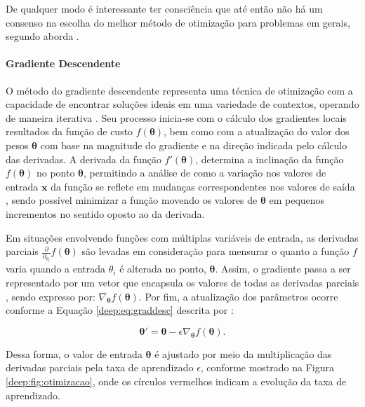 De qualquer modo é interessante ter consciência que até então não há um consenso na escolha do melhor método de otimização para problemas em gerais, segundo aborda \cite{Goodfellow2016}.


\paragraph{Gradiente Descendente}
\label{deep:optimization:graddesc}
O método do gradiente descendente representa uma técnica de otimização com a capacidade de encontrar soluções ideais em uma variedade de contextos, operando de maneira iterativa \citep{Geron2017Hands-onSystems}. Seu processo inicia-se com o cálculo dos gradientes locais resultados da função de custo $f(\boldsymbol{\theta})$, bem como com a atualização do valor dos pesos $\boldsymbol{\theta}$ com base na magnitude do gradiente e na direção indicada pelo cálculo das derivadas. A derivada da função $f'(\boldsymbol{\theta})$, determina a inclinação da função $f(\boldsymbol{\theta})$ no ponto $\boldsymbol{\theta}$, permitindo a análise de como a variação nos valores de entrada $\boldsymbol{x}$ da função se reflete em mudanças correspondentes nos valores de saída \citep{Goodfellow2016}, sendo possível minimizar a função movendo os valores de $\boldsymbol{\theta}$ em pequenos incrementos no sentido oposto ao da derivada.

Em situações envolvendo funções com múltiplas variáveis de entrada, as derivadas parciais $\frac{\partial}{\partial_{\theta_{i}}}f(\boldsymbol{\theta})$ são levadas em consideração para mensurar o quanto a função $f$ varia quando a entrada $\theta_i$ é alterada no ponto, $\boldsymbol{\theta}$. Assim, o gradiente passa a ser representado por um vetor que encapsula os valores de todas as derivadas parciais \citep{Goodfellow2016}, sendo expresso por: $\nabla_{\boldsymbol{\theta}} f(\boldsymbol{\theta})$. Por fim, a atualização dos parâmetros ocorre conforme a Equação \ref{deep:eq:graddesc} descrita por \cite{Goodfellow2016}:

\begin{equation}
    \label{deep:eq:graddesc}
    \boldsymbol{\theta}' = \boldsymbol{\theta} - \epsilon \nabla_{\boldsymbol{{\theta}}} f(\boldsymbol{\theta}).
\end{equation}

Dessa forma, o valor de entrada $\boldsymbol{\theta}$ é ajustado por meio da multiplicação das derivadas parciais pela taxa de aprendizado $\epsilon$, conforme mostrado na Figura \ref{deep:fig:otimizacao}, onde os círculos vermelhos indicam a evolução da taxa de aprendizado.

